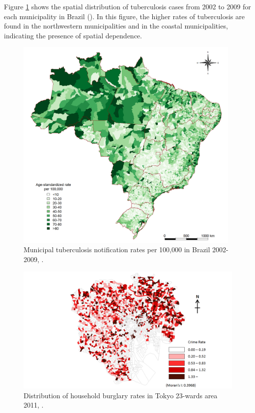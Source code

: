 \documentclass[10.5pt, A4paper, openany, uplatex]{book}
\numberwithin{equation}{section}
\begin{document}
Figure \ref{fig:Tuberculosis} shows the spatial distribution of tuberculosis cases from 2002 to 2009 for each municipality in Brazil (\cite{harling2014spatial}).
In this figure, the higher rates of tuberculosis are found in the northwestern municipalities and in the coastal municipalities, indicating the presence of spatial dependence.

\begin{figure}[h!]
	\begin{center}
		\includegraphics[width = 11cm]{Brazil.png}
		\caption{Municipal tuberculosis notification rates per 100,000 in Brazil 2002-2009, \cite{harling2014spatial}.}
		\label{fig:Tuberculosis}
	\end{center}
\end{figure}

\begin{figure}[h!]
	\begin{center}
		\includegraphics[width = 13cm]{crime.png}
		\caption{Distribution of household burglary rates in Tokyo 23-wards area 2011, \cite{hoshino2018semiparametric}.}
		\label{fig:crime}
	\end{center}
\end{figure}
\end{document}
